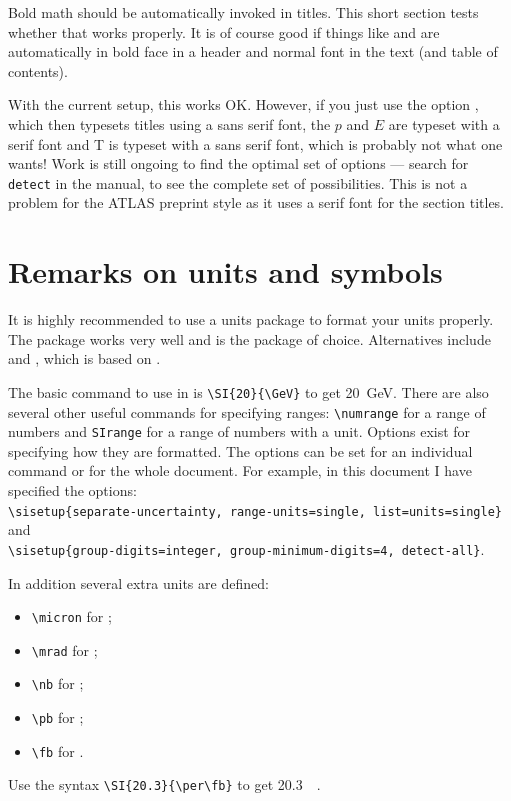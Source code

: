 Bold math should be automatically invoked in titles.
This short section tests whether that works properly.
It is of course good if things like \pT and \ET are automatically in bold face in
a header and normal font in the text (and table of contents).

With the current setup, this works OK. 
However, if you just use the option , which then typesets titles using a sans serif font,
the $p$ and $E$ are typeset with a serif font and \textsf{T} is typeset with a sans serif font,
which is probably not what one wants!
Work is still ongoing to find the optimal set of options
--- search for \texttt{detect} in the  manual, to see the complete set of possibilities.
This is not a problem for the ATLAS preprint style as it uses a serif font for the section titles.


\section{Remarks on units and symbols}

It is highly recommended to use a units package to format your units properly.
The package  works very well and is the package of choice.
Alternatives include  and ,
which is based on .

The basic command to use in  is \verb|\SI{20}{\GeV}| to get
\SI{20}{\GeV}. 
There are also several other useful commands for specifying ranges:
\verb|\numrange| for a range of numbers and \verb|SIrange| for a range of numbers with a unit. 
Options exist for specifying how they are formatted.
The options can be set for an individual command or for the whole document.
For example, in this document I have specified the options:\\
\verb|\sisetup{separate-uncertainty, range-units=single, list=units=single}|
and\\
\verb|\sisetup{group-digits=integer, group-minimum-digits=4, detect-all}|.

In addition several extra units are defined:
\begin{itemize}
\item \verb|\micron| for \si{\micron};
\item \verb|\mrad| for \si{\mrad};
\item \verb|\nb| for \si{\nb};
\item \verb|\pb| for \si{\pb};
\item \verb|\fb| for \si{\fb}.
\end{itemize}
Use the syntax \verb|\SI{20.3}{\per\fb}| to get \SI{20.3}{\per\fb}.

